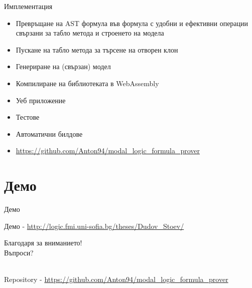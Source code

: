 \documentclass[14pt, aspectratio=169]{beamer}
\begin{document}
\begin{frame}
	\begin{example}
	\begin{center}
	\end{center}
	\end{example}
\end{frame}

\begin{frame}{Имплементация}
	\begin{itemize}
		\item Превръщане на AST формула във формула с удобни и ефективни операции свързани за табло метода и строенето на модела
		\item Пускане на табло метода за търсене на отворен клон
		\item Генериране на (свързан) модел
		\item Компилиране на библиотеката в WebAssembly
		\item Уеб приложение
		\item Тестове
		\item Автоматични билдове
		\item \url{https://github.com/Anton94/modal_logic_formula_prover}
	\end{itemize}
\end{frame}

\section{Демо}

\begin{frame}{Демо}
	\begin{center}
		Демо - \url{http://logic.fmi.uni-sofia.bg/theses/Dudov_Stoev/}
	\end{center}
\end{frame}

\begin{frame}
	\begin{center}
		\Huge
		Благодаря за вниманието!
		\\ [12mm]
		Въпроси?
	\end{center}

    \mbox{}
    \\ [20mm]
	\small
	Repository - \url{https://github.com/Anton94/modal_logic_formula_prover}
\end{frame}
\end{document}
